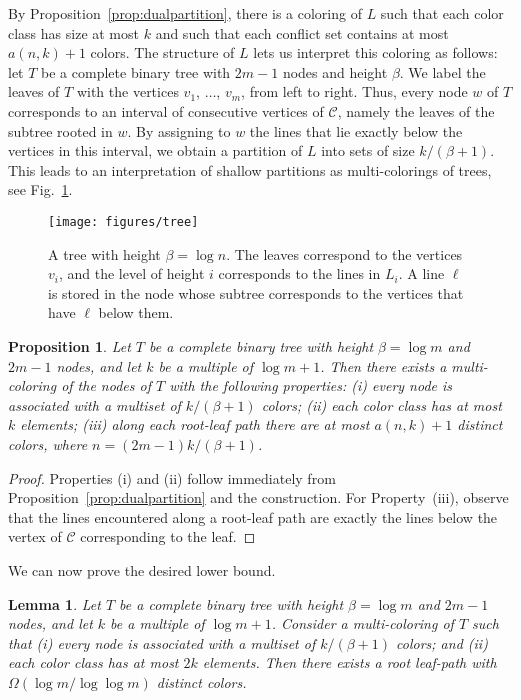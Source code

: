 \documentclass{paper}
\newtheorem {prop}[theorem] {Proposition}
\newtheorem {lemma}[theorem] {Lemma}
\begin{document}
By Proposition~\ref{prop:dualpartition}, there is a coloring of 
$L$ such that each color class 
has size at most $k$ and such that each conflict set contains at most
$a(n,k)+1$ colors. The structure of $L$ lets us interpret this
coloring as follows:
let $T$ be a complete binary tree with 
$2m-1$ nodes and height $\beta$. We label the leaves of $T$ with 
the vertices $v_1$, $\ldots$, $v_m$, from left to right. 
Thus, every node $w$ of $T$ corresponds to an interval of
consecutive vertices of $\mathcal{C}$, namely the leaves
of the subtree rooted in $w$.
By assigning to $w$ the lines that lie exactly below the
vertices in this interval,
we  obtain a partition of $L$ into sets of
size $k/(\beta + 1)$. This leads to an 
interpretation of shallow partitions as multi-colorings
of trees, see Fig.~\ref{fig:tree}.
\begin{figure}[htb] 
  \begin{center}
   \texttt{[image: figures/tree]}
  \end{center}
  \caption{A tree with height $\beta = \log n$. The leaves correspond to
  the vertices $v_i$, and the level of height $i$ corresponds to the lines
  in $L_i$. A line $\ell$ is stored in the node whose subtree corresponds to the
  vertices that have $\ell$ below them.}
  \label{fig:tree}
\end{figure}



\begin{prop}\label{prop:tree}
Let $T$ be a complete binary tree with height $\beta = \log m$ and $2m-1$ nodes,
and let $k$ be a multiple of $\log m + 1$.
Then there exists a multi-coloring of the nodes of $T$ with the
following properties: 
(i) every node is associated with a multiset of $k/(\beta + 1)$ colors;
(ii) each color class has at most $k$ elements; (iii) along each
root-leaf path there are at most $a(n,k)+1$ distinct colors,
where $n = (2m-1)k/(\beta + 1)$.
\end{prop}

\begin{proof}
Properties (i) and (ii) follow immediately from 
Proposition~\ref{prop:dualpartition} and the construction. 
For Property~(iii), observe that the lines encountered
along a root-leaf path are exactly the lines
below the vertex of $\mathcal{C}$ corresponding to the leaf.
\end{proof}

We can now prove the desired lower bound.

\begin{lemma}\label{lem:lowerb}
Let $T$ be a complete binary tree with height $\beta = \log m$ and $2m-1$ nodes, 
and let $k$ be a multiple of $\log m + 1$.
Consider a multi-coloring of $T$ such that
(i) every node is associated with a multiset of $k/(\beta+1)$
colors; and (ii) each color class has at most $2k$ elements.
Then there exists a root leaf-path with $\Omega(\log m/\log\log m)$ 
distinct colors.
\end{lemma}
\end{document}
